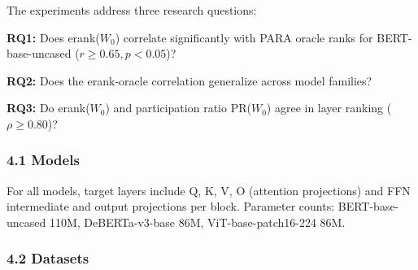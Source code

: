 
The experiments address three research questions:

\textbf{RQ1:} Does erank($W_0$) correlate significantly with PARA oracle ranks for BERT-base-uncased ($r \geq 0.65, p < 0.05$)?

\textbf{RQ2:} Does the erank-oracle correlation generalize across model families?

\textbf{RQ3:} Do erank($W_0$) and participation ratio PR($W_0$) agree in layer ranking ($\rho \geq 0.80$)?

\subsubsection{4.1 Models}

\begin{table}[htbp]
\centering
{}
\end{table}

For all models, target layers include Q, K, V, O (attention projections) and FFN intermediate and output projections per block. Parameter counts: BERT-base-uncased 110M, DeBERTa-v3-base 86M, ViT-base-patch16-224 86M.

\subsubsection{4.2 Datasets}

\begin{table}[htbp]
\centering
{}
\end{table}

